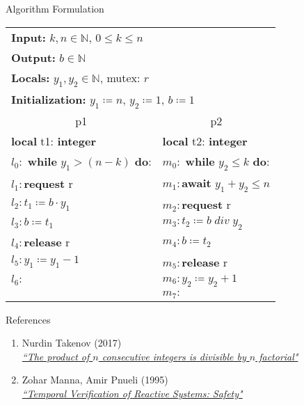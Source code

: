 \documentclass[xcolor=dvipsnames]{beamer}
\begin{document}
\begin{frame}{Algorithm Formulation}

\begin{center}
	\begin{tabular}{|l|l|}
	\hline
	\multicolumn{2}{|l|}{\textbf{Input:} $k, n \in \mathbb{N}$, $0 \leq k \leq n$} \\
	\multicolumn{2}{|l|}{\textbf{Output:} $b \in \mathbb{N}$} \\
	\multicolumn{2}{|l|}{\textbf{Locals:} $y_1, y_2 \in \mathbb{N}$, mutex: $r$} \\
	\multicolumn{2}{|l|}{\textbf{Initialization:} $y_1 \coloneqq n$, $y_2 \coloneqq 1$, $b \coloneqq 1$} \\
	
	\hline
	\multicolumn{1}{|c|}{p1} & \multicolumn{1}{|c|}{p2}\\
	\hline
	\textbf{local} t1: \textbf{integer} & \textbf{local} t2: \textbf{integer} \\
	$l_0:$ \textbf{while} $y_1 > (n - k)$ \textbf{do}: & $m_0:$ \textbf{while} $y_2 \leq k$ \textbf{do}: \\
	$l_1:$\phantom{1111}\textbf{request} r & $m_1:$\phantom{1111}\textbf{await} $y_1 + y_2 \leq n$\\
	$l_2:$\phantom{1111}$t_1 \coloneqq b \cdot y_1$ & $m_2:$\phantom{1111}\textbf{request} r \\
	$l_3:$\phantom{1111}$b \coloneqq t_1$ & $m_3:$\phantom{1111}$t_2 \coloneqq b \; div \; y_2$ \\
	$l_4:$\phantom{1111}\textbf{release} r & $m_4:$\phantom{1111}$b \coloneqq t_2$\\
	$l_5:$\phantom{1111}$y_1 \coloneqq y_1 - 1$ & $m_5:$\phantom{1111}\textbf{release} r\\
	$l_6:$ & $m_6:$\phantom{1111}$y_2 \coloneqq y_2 + 1$\\
	\phantom{1111} & $m_7:$\\
	\hline
		
	
	\end{tabular}
\end{center}

\end{frame}

\begin{frame}{References}

\begin{enumerate}
	\item Nurdin Takenov (2017)\\
	\href{https://math.stackexchange.com/questions/12065/the-product-of-n-consecutive-integers-is-divisible-by-n-factorial}{\textit{``The product of $n$ consecutive integers is divisible by $n$ factorial"}}
	
	\item Zohar Manna, Amir Pnueli (1995)\\
	\href{http://tinyurl.com/3467npny}{\textit{``Temporal Verification of Reactive Systems: Safety"}}
	
\end{enumerate}

\end{frame}
\end{document}
